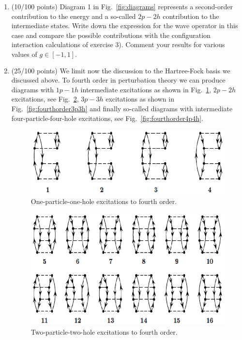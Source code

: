 \documentclass[prc]{revtex4}
\begin{document}
\begin{enumerate}
\item  (10/100 points) Diagram 1 in Fig.~\ref{fig:diagrams} represents a second-order contribution to the energy and a so-called $2p-2h$ contribution to the intermediate states. Write down the expression for the wave operator in this case and compare the possible contributions with the configuration interaction calculations of exercise 3). Comment your results for
various values of $g\in [-1,1]$.
\item  (25/100 points) We limit now the discussion to the Hartree-Fock basis  we discussed above. To fourth order in perturbation theory we can produce diagrams with $1p-1h$ intermediate excitations as shown in Fig.~\ref{fig:fourthorder1p1h}, $2p-2h$ excitations, see Fig.~\ref{fig:fourthorder2p2h}, $3p-3h$ excitations as shown in Fig.~\ref{fig:fourthorder3p3h} and finally so-called diagrams with intermediate four-particle-four-hole excitations, see Fig.~\ref{fig:fourthorder4p4h}.
\begin{figure}[hbtp]
\includegraphics{figures/1p1h.ps}
\caption{One-particle-one-hole excitations to fourth order.}
\label{fig:fourthorder1p1h}
\end{figure}
\begin{figure}[hbtp]
\includegraphics{figures/2p2h.ps}
\caption{Two-particle-two-hole excitations to fourth order.}
\label{fig:fourthorder2p2h}
\end{figure}

\end{enumerate}
\end{document}
